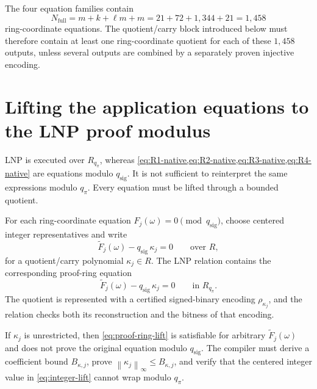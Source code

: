 \documentclass[11pt,a4paper]{article}
\newcommand{\Rpi}{R_{q_{\pi}}}
\newcommand{\sigmod}{q_{\mathrm{sig}}}
\newcommand{\proofmod}{q_{\pi}}
\newcommand{\norm}[1]{\left\lVert #1\right\rVert}
\begin{document}
The four equation families contain
\begin{equation}
  N_{\mathrm{full}}
   =m+k+\ell m+m
   =21+72+1{,}344+21
   =1{,}458
  \label{eq:Nfull}
\end{equation}
ring-coordinate equations.  The quotient/carry block introduced below must
therefore contain at least one ring-coordinate quotient for each of these
\(1{,}458\) outputs, unless several outputs are combined by a separately proven
injective encoding.

\section{Lifting the application equations to the LNP proof modulus}

LNP is executed over \(\Rpi\), whereas
\cref{eq:R1-native,eq:R2-native,eq:R3-native,eq:R4-native} are equations modulo
\(\sigmod\).  It is not sufficient to reinterpret the same expressions modulo
\(\proofmod\).  Every equation must be lifted through a bounded quotient.

For each ring-coordinate equation \(F_j(\omega)=0\pmod{\sigmod}\), choose
centered integer representatives and write
\begin{equation}
  \widetilde F_j(\omega)-\sigmod\,\kappa_j=0
  \qquad\text{over }R,
  \label{eq:integer-lift}
\end{equation}
for a quotient/carry polynomial \(\kappa_j\in R\).  The LNP relation contains
the corresponding proof-ring equation
\begin{equation}
  \widetilde F_j(\omega)-\sigmod\,\kappa_j=0
  \qquad\text{in }\Rpi.
  \label{eq:proof-ring-lift}
\end{equation}
The quotient is represented with a certified signed-binary encoding
\(\rho_{\kappa_j}\), and the relation checks both its reconstruction and the
bitness of that encoding.

\begin{importantbox}
If \(\kappa_j\) is unrestricted, then
\cref{eq:proof-ring-lift} is satisfiable for arbitrary
\(\widetilde F_j(\omega)\) and does not prove the original equation modulo
\(\sigmod\).  The compiler must derive a coefficient bound
\(B_{\kappa,j}\), prove
\(\norm{\kappa_j}_\infty\le B_{\kappa,j}\), and verify that the centered
integer value in \cref{eq:integer-lift} cannot wrap modulo \(\proofmod\).
\end{importantbox}
\end{document}
